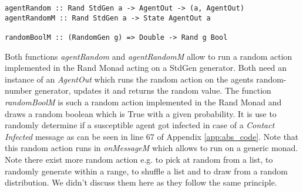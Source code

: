 \begin{verbatim}
agentRandom :: Rand StdGen a -> AgentOut -> (a, AgentOut)
agentRandomM :: Rand StdGen a -> State AgentOut a

randomBoolM :: (RandomGen g) => Double -> Rand g Bool
\end{verbatim}

Both functions \textit{agentRandom} and \textit{agentRandomM} allow to run a random action implemented in the Rand Monad acting on a StdGen generator. Both need an instance of an \textit{AgentOut} which runs the random action on the agents random-number generator, updates it and returns the random value.
The function \textit{randomBoolM} is such a random action implemented in the Rand Monad and draws a random boolean which is True with a given probability. It is use to randomly determine if a susceptible agent got infected in case of a \textit{Contact Infected} message as can be seen in line 67 of Appendix \ref{app:abs_code}. Note that this random action runs in \textit{onMessageM} which allows to run on a generic monad. Note there exist more random action e.g. to pick at random from a list, to randomly generate within a range, to shuffle a list and to draw from a random distribution. We didn't discuss them here as they follow the same principle.